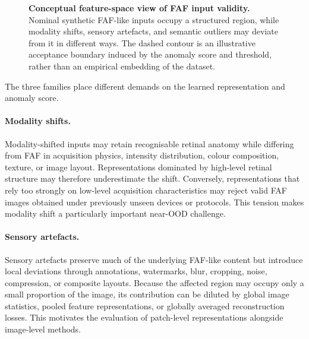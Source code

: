 \documentclass[fleqn,12pt]{olplainarticle}
\begin{document}
\begin{figure}[htbp]

\caption[Conceptual nominal support and OOD families.]{\textbf{Conceptual
feature-space view of FAF input validity.}
Nominal synthetic FAF-like inputs occupy a structured region, while modality shifts, sensory artefacts, and semantic outliers may deviate from it in different ways. The dashed contour is an illustrative acceptance boundary induced by the anomaly score and threshold, rather than an empirical embedding of the dataset.}
\label{fig:manifold_concept}
\end{figure}


The three families place different demands on the learned representation and anomaly score.

\paragraph{Modality shifts.}
Modality-shifted inputs may retain recognisable retinal anatomy while differing from FAF in acquisition physics, intensity distribution, colour composition, texture, or image layout. Representations dominated by high-level retinal structure may therefore underestimate the shift. Conversely, representations that rely too strongly on low-level acquisition characteristics may reject valid FAF images obtained under previously unseen devices or protocols. This tension makes modality shift a particularly important near-OOD challenge.

\paragraph{Sensory artefacts.}
Sensory artefacts preserve much of the underlying FAF-like content but introduce local deviations through annotations, watermarks, blur, cropping, noise, compression, or composite layouts. Because the affected region may occupy only a small proportion of the image, its contribution can be diluted by global image statistics, pooled feature representations, or globally averaged reconstruction losses. This motivates the evaluation of patch-level representations alongside image-level methods.
\end{document}
